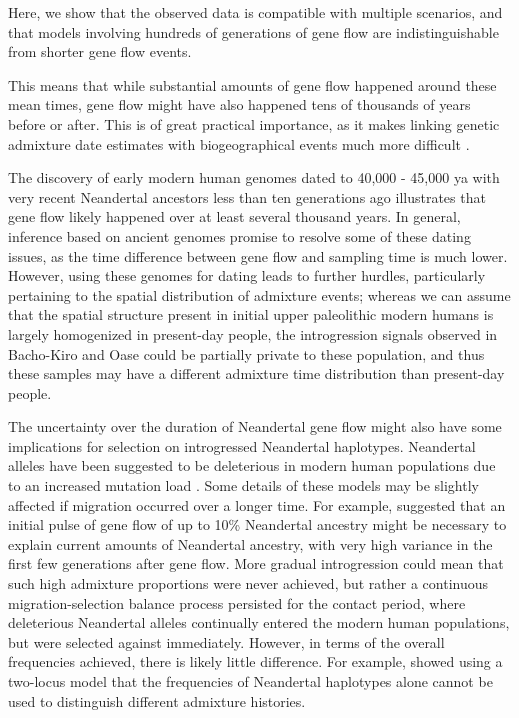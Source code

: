 \documentclass[11pt]{article}
\begin{document}
Here, we show that the observed data is compatible with multiple scenarios, and that models involving hundreds of generations of gene flow are indistinguishable from shorter gene flow events. 

This means that while substantial amounts of gene flow happened around these mean times, gene flow might have also happened tens of thousands of years before or after. This is of great practical importance, as it makes linking genetic admixture date estimates with biogeographical events much more difficult \citep{sankararaman_date_2012,lazaridis_genomic_2016,douka_age_2019,jacobs_multiple_2019,vyas_analyses_2019}. 

The discovery of early modern human genomes dated to 40,000 - 45,000 ya with very recent Neandertal ancestors less than ten generations ago \citep{fu_genome_2014, hajdinjak_early_2021} illustrates that gene flow likely happened over at least several thousand years.  In general, inference based on ancient genomes \citep{fu_genome_2014, fu_early_2015, moorjani_genetic_2016} promise to resolve some of these dating issues, as the time difference between gene flow and sampling time is much lower. However, using these genomes for dating leads to further hurdles, particularly pertaining to the spatial distribution of admixture events; whereas we can assume that the spatial structure present in initial upper paleolithic modern humans is largely homogenized in present-day people, the introgression signals observed in Bacho-Kiro and Oase could be partially private to these population, and thus these samples may have a different admixture time distribution than present-day people.

The uncertainty over the duration of Neandertal gene flow might also have some implications for selection on introgressed Neandertal haplotypes. Neandertal alleles have been suggested to be deleterious in modern human populations due to an increased mutation load \citep{harris_genetic_2016, juric_strength_2016}. Some details of these models may be slightly affected if migration occurred over a longer time. For example, \cite{harris_genetic_2016} suggested that an initial pulse of gene flow of up to 10\% Neandertal ancestry might be necessary to explain current amounts of Neandertal ancestry, with very high variance in the first few generations after gene flow. More gradual introgression could mean that such high admixture proportions were never achieved, but rather a continuous migration-selection balance process persisted for the contact period, where deleterious Neandertal alleles continually entered the modern human populations, but were selected against immediately. 
However, in terms of the overall frequencies achieved, there is likely little difference. For example, \cite{juric_strength_2016} showed using a two-locus model that the frequencies of Neandertal haplotypes alone cannot be used to distinguish different admixture histories.
\end{document}
